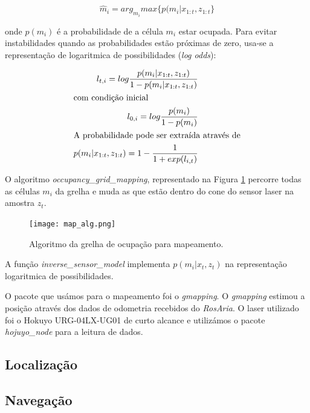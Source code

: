 \documentclass[journal]{IEEEtran}
\begin{document}
\begin{equation}
  \label{eq:map_2}
  \hat{m}_i = arg_{m_{i}} max \{ p(m_i|x_{1:t},z_{1:t} \}
\end{equation}

onde $p(m_i)$ é a probabilidade de a célula $m_i$ estar ocupada. Para evitar instabilidades quando as probabilidades estão próximas de zero, usa-se a representação de logaritmica de possibilidades (\textit{log odds}):

\begin{align}
  \label{eq:logodds}
  l_{t,i} = log \frac{p(m_i | x_{1:t},z_{1:t})} {1-p(m_i | x_{1:t},z_{1:t})} \\
  \intertext{com condição inicial}
  l_{0,i} = log \frac{p(m_i)} {1-p(m_i)} \\
  \intertext{A probabilidade pode ser extraída através de}
  p(m_i|x_{1:t},z_{1:t}) = 1- \frac {1} {1+exp(l_{i,t})}
\end{align}

O algoritmo \textit{occupancy\_grid\_mapping}, representado na Figura \ref{fig:map_alg} percorre todas as células $m_i$ da grelha e muda as que estão dentro do cone do sensor laser na amostra $z_t$.

\begin{figure}[ht]
  \centering
  \texttt{[image: map\_alg.png]}
  \caption{Algoritmo da grelha de ocupação para mapeamento.}
  \label{fig:map_alg}
\end{figure}

A função \textit{inverse\_sensor\_model} implementa $p(m_i | x_t,z_t)$ na representação logaritmica de possibilidades.

O pacote que usámos para o mapeamento foi o \textit{gmapping}. O \textit{gmapping} estimou a posição através dos dados de odometria recebidos do \textit{RosAria}. O laser utilizado foi o Hokuyo URG-04LX-UG01 de curto alcance e utilizámos o pacote \textit{hojuyo\_node} para a leitura de dados.


\subsection{Localização}

%
%

\subsection{Navegação}
\end{document}
